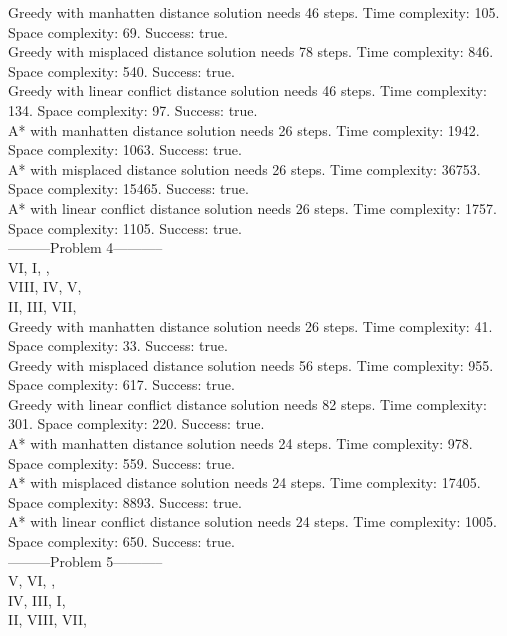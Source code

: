 \documentclass[paper=a4, fontsize=11pt]{scrartcl} %
\numberwithin{equation}{section} %
\numberwithin{figure}{section} %
\numberwithin{table}{section} %
\begin{document}
Greedy with manhatten distance solution needs 46 steps. Time complexity: 105. Space complexity: 69. Success: true.\\ 
Greedy with misplaced distance solution needs 78 steps. Time complexity: 846. Space complexity: 540. Success: true.\\ 
Greedy with linear conflict distance solution needs 46 steps. Time complexity: 134. Space complexity: 97. Success: true.\\ 
A* with manhatten distance solution needs 26 steps. Time complexity: 1942. Space complexity: 1063. Success: true.\\ 
A* with misplaced distance solution needs 26 steps. Time complexity: 36753. Space complexity: 15465. Success: true.\\ 
A* with linear conflict distance solution needs 26 steps. Time complexity: 1757. Space complexity: 1105. Success: true.\\ 
---------Problem 4-----------\\ 
VI, I, , \\ 
VIII, IV, V,\\  
II, III, VII, \\ 

Greedy with manhatten distance solution needs 26 steps. Time complexity: 41. Space complexity: 33. Success: true.\\ 
Greedy with misplaced distance solution needs 56 steps. Time complexity: 955. Space complexity: 617. Success: true.\\ 
Greedy with linear conflict distance solution needs 82 steps. Time complexity: 301. Space complexity: 220. Success: true.\\ 
A* with manhatten distance solution needs 24 steps. Time complexity: 978. Space complexity: 559. Success: true.\\ 
A* with misplaced distance solution needs 24 steps. Time complexity: 17405. Space complexity: 8893. Success: true.\\ 
A* with linear conflict distance solution needs 24 steps. Time complexity: 1005. Space complexity: 650. Success: true.\\ 
---------Problem 5-----------\\ 
V, VI, , \\ 
IV, III, I, \\ 
II, VIII, VII, \\ 
\end{document}
